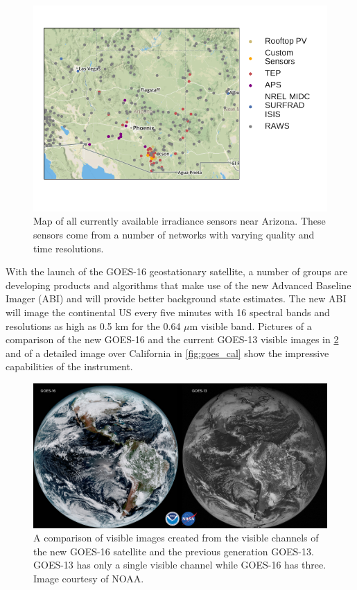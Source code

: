 \begin{figure}[h]
\centering
\includegraphics[width=\textwidth]{figs/azmap.pdf}
\vspace{-3em}
\caption[Map of all available irradiance sensors]{Map of all currently
available irradiance sensors near Arizona. These sensors come from a
number of networks with varying quality and time resolutions.}
\label{fig:allsensors}
\end{figure}

With the launch of the GOES-16 geostationary satellite, a number of
groups are developing products and algorithms that make use of the new
Advanced Baseline Imager (ABI) and will provide better background
state estimates.
The new ABI will image the continental US every five minutes with 16
spectral bands and resolutions as high as 0.5 km for the 0.64 $\mu$m
visible band.
Pictures of a comparison of the new GOES-16 and the current GOES-13
visible images in \cref{fig:goes_comp} and of a detailed image over
California in \cref{fig:goes_cal} show the impressive capabilities of
the instrument.

\begin{figure}[t]
\centering
\includegraphics[width=\textwidth]{figs/goes_comp.jpg}
\caption[Comparison of visible images from the current and future
GOES]{A comparison of visible images created from the visible channels
of the new GOES-16 satellite and the previous generation
GOES-13. GOES-13 has only a single visible channel while GOES-16 has
three. Image courtesy of NOAA.}
\label{fig:goes_comp}
\end{figure}

